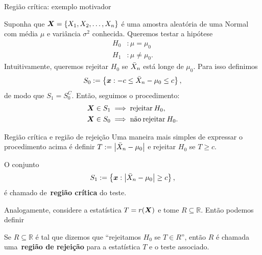 \begin{frame}{Região crítica: exemplo motivador}
 \begin{exemplo}
  \label{ex:test_normal_mean_knownVar}
  Suponha que $\boldsymbol{X} = \{ X_1, X_2, \ldots, X_n \}$ é uma amostra aleatória de uma Normal com média $\mu$ e variância $\sigma^2$ conhecida.
  Queremos testar a hipótese
  \begin{align*}
   H_0 &: \mu = \mu_0\\
   H_1 &: \mu \neq \mu_0.
  \end{align*}
  Intuitivamente, queremos rejeitar $H_0$ se $\bar{X}_n$ está longe de $\mu_0$.
  Para isso definimos
  \[ S_0 := \left\{ \boldsymbol{x}: -c \leq \bar{X}_n - \mu_0 \leq c \right\}, \]
  de modo que $S_1 = S_0^C$. 
  Então, seguimos o procedimento:
      \begin{align*}
   \boldsymbol{X} \in S_1 &\implies \text{rejeitar}\: H_0,\\
   \boldsymbol{X} \in S_0 &\implies \text{não\:rejeitar}\: H_0.\\
  \end{align*}
 \end{exemplo}
\end{frame}

\begin{frame}{Região crítica e região de rejeição}
 Uma maneira mais simples de expressar o procedimento acima é definir $T := \left|\bar{X}_n - \mu_0\right|$ e rejeitar $H_0$ se $T \geq c$.
 \begin{defn}
 \label{def:critical_region}
  O conjunto 
   \[ S_1 := \left\{ \boldsymbol{x}:  \left|\bar{X}_n - \mu_0\right| \geq c \right\}, \]
   é chamado de~\textbf{região crítica} do teste.
 \end{defn}
 
Analogamente, considere a estatística $T = r(\boldsymbol{X})$ e tome $R \subseteq \mathbb{R}$. 
Então podemos definir
\begin{defn}
\label{def:rejection_region}
Se $R \subseteq \mathbb{R}$ é tal que dizemos que ``rejeitamos $H_0$ se $T \in R$'', então $R$ é chamada uma~\textbf{região de rejeição} para a estatística $T$ e o teste associado.
\end{defn}
\end{frame}

